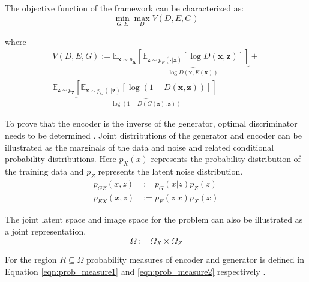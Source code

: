 The objective function of the framework can be characterized as:
\begin{equation}
    \min _{G, E} \max _{D} V(D, E, G)
\end{equation}
 
where
\begin{multline}
    \label{eqn:bigan_v}
V(D, E, G) :=\mathbb{E}_{\mathbf{x} \sim p_{\mathbf{X}}}  \underbrace{\left[ \mathbb{E}_{\mathbf{z} \sim p_{E}(\cdot | \mathbf{x})}[\log D(\mathbf{x}, \mathbf{z})] \right]}_{\log D(\mathbf{x}, E(\mathbf{x}))} + \\ \mathbb{E}_{\mathbf{z} \sim p_{\mathbf{Z}}} \underbrace{  \left[ \mathbb{E}_{\mathbf{x} \sim p_{G}(\cdot | \mathbf{z})}[\log (1-D(\mathbf{x}, \mathbf{z}))] \right]}_{\log (1-D(G(\mathbf{z}), \mathbf{z}))}
\end{multline}

To prove that the encoder is the inverse of the generator, optimal discriminator needs to be
determined \cite{Donahue2017AdversarialFL}. Joint distributions of the generator and encoder can
be illustrated as the marginals of the data and noise and related conditional probability
distributions. Here $p_{X}(x)$ represents the probability distribution of the training data and $p_{Z}$ 
represents the latent noise distribution.
\begin{align}
    \label{eqn:bigan_gz}
    p_{GZ} (x, z ) &:= p_G(x | z) p_{Z} (z) \\[5pt] 
    \label{eqn:bigan_ex}
    p_{EX} (x, z ) &:= p_E(z | x) p_{X} (x) 
\end{align}

The joint latent space and image space for the problem can also be illustrated as a joint
representation.
$$
\Omega := \Omega_{X} \times \Omega_{Z}
$$

For the region $R \subseteq \Omega$ probability
measures \cite{RePEc:eee:csdana:v:20:y:1995:i:6:p:703-702} of encoder and generator is defined in
Equation \ref{eqn:prob_measure1} and \ref{eqn:prob_measure2} respectively \cite{Donahue2017AdversarialFL}.

